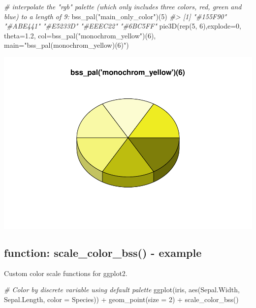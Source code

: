 \documentclass[
]{article}
\newenvironment{Shaded}{\begin{snugshade}}{\end{snugshade}}
\newcommand{\AttributeTok}[1]{\textcolor[rgb]{0.77,0.63,0.00}{#1}}
\newcommand{\CommentTok}[1]{\textcolor[rgb]{0.56,0.35,0.01}{\textit{#1}}}
\newcommand{\DecValTok}[1]{\textcolor[rgb]{0.00,0.00,0.81}{#1}}
\newcommand{\FloatTok}[1]{\textcolor[rgb]{0.00,0.00,0.81}{#1}}
\newcommand{\FunctionTok}[1]{\textcolor[rgb]{0.00,0.00,0.00}{#1}}
\newcommand{\NormalTok}[1]{#1}
\newcommand{\SpecialCharTok}[1]{\textcolor[rgb]{0.00,0.00,0.00}{#1}}
\newcommand{\StringTok}[1]{\textcolor[rgb]{0.31,0.60,0.02}{#1}}
\begin{document}
\begin{Shaded}
\begin{Highlighting}[]
\CommentTok{\# interpolate the "rgb" palette (which only includes three colors, red, green and blue) to a length of 9:}
\FunctionTok{bss\_pal}\NormalTok{(}\StringTok{"main\_only\_color"}\NormalTok{)(}\DecValTok{5}\NormalTok{)}
\CommentTok{\#\textgreater{} [1] "\#155F90" "\#ABE441" "\#E5233D" "\#EEEC22" "\#6BC5FF"}
\FunctionTok{pie3D}\NormalTok{(}\FunctionTok{rep}\NormalTok{(}\DecValTok{5}\NormalTok{, }\DecValTok{6}\NormalTok{),}\AttributeTok{explode=}\DecValTok{0}\NormalTok{, }\AttributeTok{theta=}\FloatTok{1.2}\NormalTok{, }\AttributeTok{col=}\FunctionTok{bss\_pal}\NormalTok{(}\StringTok{"monochrom\_yellow"}\NormalTok{)(}\DecValTok{6}\NormalTok{), }\AttributeTok{main=}\StringTok{"bss\_pal(\textquotesingle{}monochrom\_yellow\textquotesingle{})(6)"}\NormalTok{)}
\end{Highlighting}
\end{Shaded}

\includegraphics[width=1\linewidth]{man/figures/README-bss_pal-1}

\hypertarget{function-scale_color_bss---example}{%
\subsection{function: scale\_color\_bss() -
example}\label{function-scale_color_bss---example}}

Custom color scale functions for ggplot2.

\begin{Shaded}
\begin{Highlighting}[]
\CommentTok{\# Color by discrete variable using default palette}
\FunctionTok{ggplot}\NormalTok{(iris, }\FunctionTok{aes}\NormalTok{(Sepal.Width, Sepal.Length, }\AttributeTok{color =}\NormalTok{ Species)) }\SpecialCharTok{+}
  \FunctionTok{geom\_point}\NormalTok{(}\AttributeTok{size =} \DecValTok{2}\NormalTok{) }\SpecialCharTok{+}
  \FunctionTok{scale\_color\_bss}\NormalTok{()}
\end{Highlighting}
\end{Shaded}
\end{document}
